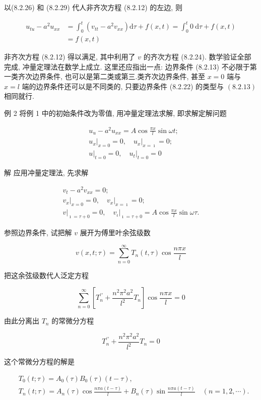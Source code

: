 以(8.2.26) 和 (8.2.29) 代人非齐次方程 (8.2.12) 的左边, 则

$$
\begin{aligned}
u_{t u}-a^{2} u_{x x} & =\int_{0}^{t}\left(v_{t t}-a^{2} v_{x x}\right) \mathrm{d} \tau+f(x, t)=\int_{0}^{t} 0 \mathrm{~d} \tau+f(x, t) \\
& =f(x, t)
\end{aligned}
$$

非齐次方程 (8.2.12) 得以满足, 其中利用了 $v$ 的齐次方程 (8.2.24).
数学验证全部完成, 冲量定理法在数学上成立. 这里还应指出一点: 边界条件 (8.2.13) 不必限于第一类齐次边界条件, 也可以是第二类或第三.类齐次边界条件, 甚至 $x=0$ 端与 $x=l$ 端的边界条件还可以是不同类的, 只要边界条件 (8.2.22) 的类型与 $(8.2 .13)$ 相同就行.

例 2 将例 1 中的初始条件改为零值, 用冲量定理法求解, 即求解定解问题

$$
\begin{aligned}
& u_{u}-a^{2} u_{x x}=A \cos \frac{\pi x}{l} \sin \omega t ; \\
& \left.u_{x}\right|_{x=0}=0,\left.\quad u_{x}\right|_{x=\imath}=0 ; \\
& \left.u\right|_{t=0}=0,\left.\quad u_{t}\right|_{t=0}=0
\end{aligned}
$$

解 应用冲量定理法, 先求解

$$
\begin{gathered}
v_{t}-a^{2} v_{x x}=0 ; \\
\left.v_{x}\right|_{x=0}=0,\left.\quad v_{x}\right|_{x=\imath}=0 ; \\
\left.v\right|_{\imath=\tau+0}=0,\left.\quad v_{\iota}\right|_{\imath=\tau+0}=A \cos \frac{\pi x}{l} \sin \omega \tau .
\end{gathered}
$$

参照边界条件, 试把解 $v$ 展开为傅里叶余弦级数

$$
v(x, t ; \tau)=\sum_{n=0}^{\infty} T_{n}(t, \tau) \cos \frac{n \pi x}{l}
$$

把这余弦级数代人泛定方程

$$
\sum_{n=0}^{\infty}\left[T_{n}^{\prime \prime}+\frac{n^{2} \pi^{2} a^{2}}{l^{2}} T_{n}\right] \cos \frac{n \pi x}{l}=0
$$

由此分离出 $T_{n}$ 的常微分方程

$$
T_{n}^{\prime \prime}+\frac{n^{2} \pi^{2} a^{2}}{l^{2}} T_{n}=0
$$

这个常微分方程的解是

$$
\begin{aligned}
& T_{0}(t ; \tau)=A_{0}(\tau) B_{0}(\tau)(t-\tau), \\
& T_{n}(t ; \tau)=A_{n}(\tau) \cos \frac{n \pi a(t-\tau)}{l}+B_{n}(\tau) \sin \frac{n \pi a(t-\tau)}{l} \quad(n=1,2, \cdots) .
\end{aligned}
$$

